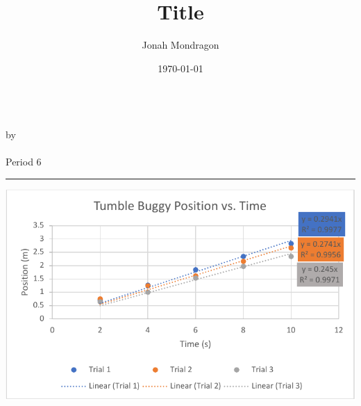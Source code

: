 \documentclass[12pt]{article}
\newcommand{\PutTitle}[1]
{
    \begin{center}
        {\huge\bfseries\thetitle}\\
        by \theauthor\\
        \thedate\\
        #1        
    \end{center}
    \hrule
    \vspace{2ex}
}
\begin{document}
\title{Title}
\author{Jonah Mondragon}
\date{\today}
\PutTitle{Period 6}

\doublespacing


\begin{center}
\includegraphics{tumble_buggy_position_vs_time_graph.pdf}
\end{center}
\end{document}
